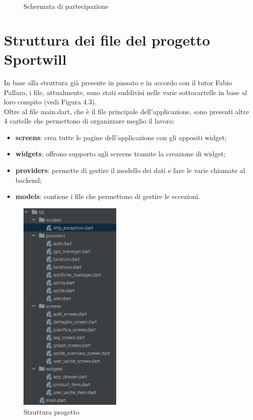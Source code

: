 \begin{figure}[htbp]
\begin{minipage}[b]{0.47\textwidth}
		\caption{Schermata di partecipazione}
		\label{fig:Schermata di partecipazione}
	\end{minipage}
\end{figure}
 
 \newpage

\section{Struttura dei file del progetto Sportwill}

In base alla struttura già presente in passato e in accordo con il tutor Fabio Pallaro, i file, attualmente, sono stati suddivisi nelle varie sottocartelle in base al loro compito (vedi Figura 4.3).\\
Oltre al file main.dart, che è il file principale dell'applicazione, sono presenti altre 4 cartelle che permettono di organizzare meglio il lavoro:
\begin{itemize}
	\item \textbf{screens}: crea tutte le pagine dell'applicazione con gli appositi widget;
	\item \textbf{widgets}: offrono supporto agli screens tramite la creazione di widget;
	\item \textbf{providers}: permette di gestire il modello dei dati e fare le varie chiamate al backend;
	\item \textbf{models}: contiene i file che permettono di gestire le eccezioni.
\end{itemize}
\begin{figure}[htbp]	
	\centering
	\includegraphics[width=5cm]{immagini/struttura.png}
	\caption{Struttura progetto}
	\label{fig:Struttura progetto}
\end{figure}

